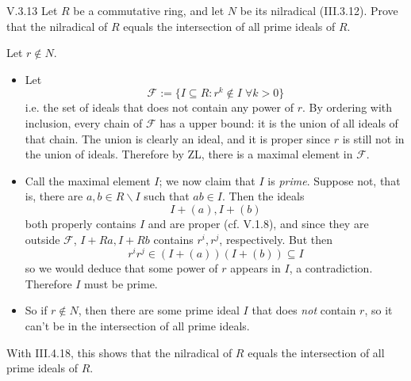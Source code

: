 \begin{problem}{V.3.13}
Let $R$ be a commutative ring, and let $N$ be its nilradical (III.3.12). Prove that the nilradical of $R$ equals the intersection of all prime ideals of $R$.
\end{problem}
\begin{pf}
Let $r \notin N$.
\begin{itemize}
	\setlength\itemsep{0pt}
	\item Let
	\[
	\mathscr{F} := \{I \subseteq R: r^k \notin I \; \forall k>0\}
	\]
	i.e. the set of ideals that does not contain any power of $r$. By ordering with inclusion, every chain of $\mathcal{F}$ has a upper bound: it is the union of all ideals of that chain. The union is clearly an ideal, and it is proper since $r$ is still not in the union of ideals. Therefore by ZL, there is a maximal element in $\mathscr{F}$.
	\item Call the maximal element $I$; we now claim that $I$ is \emph{prime}. Suppose not, that is, there are $a,b \in R \backslash I$ such that $ab \in I$. Then the ideals
	\[
	I + (a), I+(b)
	\]
	both properly contains $I$ and are proper (cf. V.1.8), and since they are outside $\mathscr{F}$, $I+Ra, I+Rb$ contains $r^i,r^j$, respectively. But then
	\[
	r^i r^j \in (I+(a))(I+(b)) \subseteq I
	\]
	so we would deduce that some power of $r$ appears in $I$, a contradiction. Therefore $I$ must be prime.
	\item So if $r \notin N$, then there are some prime ideal $I$ that does \emph{not} contain $r$, so it can't be in the intersection of all prime ideals.
\end{itemize}
With III.4.18, this shows that the nilradical of $R$ equals the intersection of all prime ideals of $R$.
\end{pf}